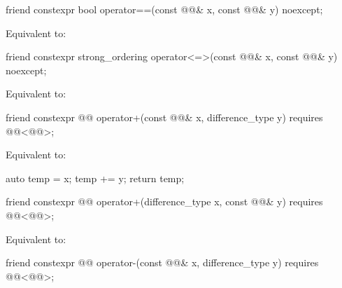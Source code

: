 %
\begin{itemdecl}
friend constexpr bool operator==(const @@& x, const @@& y) noexcept;
\end{itemdecl}

\begin{itemdescr}
\pnum
\effects
Equivalent to: 
\end{itemdescr}

%
\begin{itemdecl}
friend constexpr strong_ordering operator<=>(const @@& x, const @@& y) noexcept;
\end{itemdecl}

\begin{itemdescr}
\pnum
\effects
Equivalent to: 
\end{itemdescr}

%
\begin{itemdecl}
friend constexpr @@ operator+(const @@& x, difference_type y)
  requires @@<@@>;
\end{itemdecl}

\begin{itemdescr}
\pnum
\effects
Equivalent to:
\begin{codeblock}
auto temp = x;
temp += y;
return temp;
\end{codeblock}
\end{itemdescr}

%
\begin{itemdecl}
friend constexpr @@ operator+(difference_type x, const @@& y)
  requires @@<@@>;
\end{itemdecl}

\begin{itemdescr}
\pnum
\effects
Equivalent to: 
\end{itemdescr}

%
\begin{itemdecl}
friend constexpr @@ operator-(const @@& x, difference_type y)
  requires @@<@@>;
\end{itemdecl}

